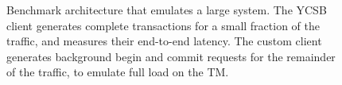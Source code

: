 
\begin{figure}
\caption{Benchmark architecture that emulates a large system. The YCSB client generates complete transactions 
for a small fraction of the traffic, and measures their end-to-end latency. The custom client generates background 
begin and commit requests for the remainder of the traffic, to emulate full load on the TM.}
\label{fig:experiment}
\end{figure}

